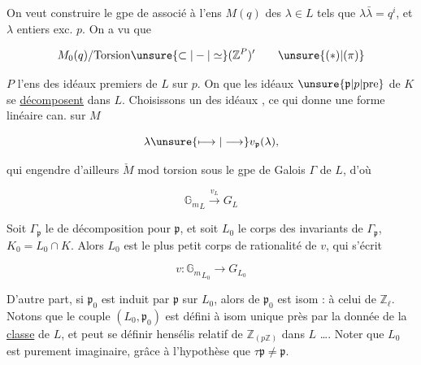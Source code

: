 

On veut construire le gpe de   associé
à l'ens $M(q)$ des $\lambda\in L$ tels que $\lambda\bar\lambda=q^i$,
et $\lambda$ entiers exc. $p$. On a vu que

\[
M_0(q)/\mathrm{Torsion}\unsure{\subset|-|\simeq}(\mathbb Z^P)'\tag*{\unsure{(\ensuremath{*})|(\ensuremath{\pi})}}
\]

$P$ l'ens des idéaux premiers de $L$ sur $p$.
On  que les idéaux $\unsure{\mathfrak p|p|\text{pre}}$ de $K$ se \uline{décomposent} dans $L$.
Choisissons un des  idéaux , ce qui donne
une forme linéaire can. sur $M$

\[
\lambda\unsure{\longmapsto|\longrightarrow}v_{\mathfrak p}(\lambda),
\]

qui engendre d'ailleurs $\check M$ mod torsion sous  le
gpe de Galois $\Gamma$ de $L$, d'où

\[
{\mathbb G_m}_L\xrightarrow{v_L}G_L
\]

Soit $\Gamma_{\mathfrak p}$ le  de décomposition pour $\mathfrak p$,  et soit  $L_0$ le corps des
invariants de $\Gamma_{\mathfrak p}$, $K_0=L_0\cap K$. Alors
$L_0$ est le plus petit corps de rationalité de $v$,
qui s'écrit 

\[
v:{\mathbb G_m}_{L_0}\longrightarrow G_{L_0}
\]

D'autre part, si $\mathfrak p_0$ est induit par $\mathfrak p$ sur $L_0$,
alors  
de $\mathfrak p_0$ est  isom : à celui de
$\mathbb Z_{\ell}$. Notons que le couple $(L_0,\mathfrak p_0)$ est défini
à isom unique près par la donnée de la \uline{classe}
de $L$, et peut se définir    hensélis
relatif de $\mathbb Z_{(p\mathbb Z)}$ dans $L$ \ldots. Noter que $L_0$ est
purement imaginaire, grâce à l'hypothèse
que $\tau\mathfrak p\ne\mathfrak p$.

